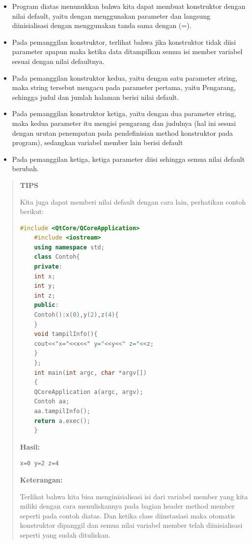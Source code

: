 \begin{itemize}
\tightlist
\item
  Program diatas menunukkan bahwa kita dapat membuat konstruktor dengan
  nilai default, yaitu dengan menggunakan parameter dan langsung
  diinisialisasi dengan menggunakan tanda sama dengan (=).
\item
  Pada pemanggilan konstruktor, terlihat bahwa jika konstruktor tidak
  diisi parameter apapun maka ketika data ditampilkan semua isi member
  variabel sesuai dengan nilai defaultnya.
\item
  Pada pemanggilan konstruktor kedua, yaitu dengan satu parameter
  string, maka string tersebut mengacu pada parameter pertama, yaitu
  Pengarang, sehingga judul dan jumlah halaman berisi nilai default.
\item
  Pada pemanggilan konstruktor ketiga, yaitu dengan dua parameter
  string, maka kedua parameter itu mengisi pengarang dan judulnya (hal
  ini sesuai dengan urutan penempatan pada pendefinisian method
  konstruktor pada program), sedangkan variabel member lain berisi
  default
\item
  Pada pemanggilan ketiga, ketiga parameter diisi sehingga semua nilai
  default berubah.
\end{itemize}
\begin{quotation}
	\textbf{TIPS} 
	
	Kita juga
	dapat memberi nilai default dengan cara lain, perhatikan contoh berikut:
	
	\begin{lstlisting}[language=c++]
	#include <QtCore/QCoreApplication>
	#include <iostream>
	using namespace std;
	class Contoh{
	private:
	int x;
	int y;
	int z;
	public:
	Contoh():x(0),y(2),z(4){
	}
	void tampilInfo(){
	cout<<"x="<<x<<" y="<<y<<" z="<<z;
	}
	};
	int main(int argc, char *argv[])
	{
	QCoreApplication a(argc, argv);
	Contoh aa;
	aa.tampilInfo();
	return a.exec();
	}
	\end{lstlisting}
	
	\textbf{Hasil:}
	
\begin{verbatim}
x=0 y=2 z=4
\end{verbatim}
	
	\textbf{Keterangan:}
	
	Terlihat bahwa kita bisa menginisialisasi isi dari variabel member yang
	kita miliki dengan cara menuliskannya pada bagian header method member
	seperti pada contoh diatas. Dan ketika class diinstasiasi maka otomatis
	konstruktor dipanggil dan semua nilai variabel member telah
	diinisialisasi seperti yang sudah dituliskan.
\end{quotation}


